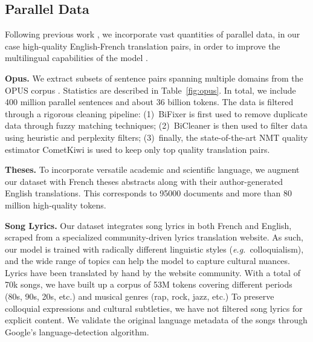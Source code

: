 \subsection{Parallel Data}
Following previous work ,
we incorporate vast quantities of parallel data, in our case high-quality English-French translation pairs, in order to improve the multilingual capabilities of the model .


\textbf{Opus.}
We extract subsets of sentence pairs spanning multiple domains from the OPUS corpus .
Statistics are described in Table~\ref{fig:opus}.
In total, we include 400 million parallel sentences and about 36 billion tokens. The data is filtered through a rigorous cleaning pipeline:
(1)~BiFixer  is first used to remove duplicate data through fuzzy matching techniques;
(2)~BiCleaner is then used to filter data using heuristic and perplexity filters;
(3)~finally, the state-of-the-art NMT quality estimator CometKiwi  is used to keep only top quality translation pairs. 
 


\textbf{Theses.} To incorporate versatile academic and scientific language, we augment our dataset with French theses abstracts along with their author-generated English translations. This corresponds to 95000 documents and more than 80 million high-quality tokens.



\textbf{Song Lyrics.}
Our dataset integrates song lyrics in both French and English, scraped from a specialized community-driven lyrics translation website.
As such, our model is trained with radically different linguistic styles (\emph{e.g.}\ colloquialism), and the wide range of topics can help the model to capture cultural nuances. 
Lyrics have been translated by hand by the website community. With a total of 70k songs, we have built up a corpus of 53M tokens covering different periods (80s, 90s, 20s, etc.) and musical genres (rap, rock, jazz, etc.) To preserve colloquial expressions and cultural subtleties, we have not filtered song lyrics for explicit content. We validate the original language metadata of the songs through Google's language-detection algorithm. 

